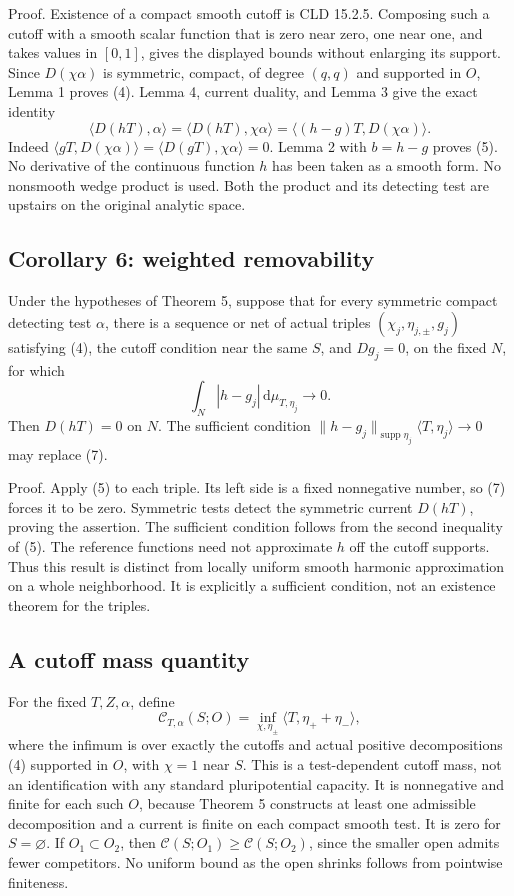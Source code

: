 \documentclass[11pt]{article}
\begin{document}
Proof. Existence of a compact smooth cutoff is CLD 15.2.5. Composing such a cutoff with a smooth scalar function that is zero near zero, one near one, and takes values in \([0,1]\), gives the displayed bounds without enlarging its support. Since \(D(\chi\alpha)\) is symmetric, compact, of degree \((q,q)\) and supported in \(O\), Lemma 1 proves (4). Lemma 4, current duality, and Lemma 3 give the exact identity
\[
 \langle D(hT),\alpha\rangle
 =\langle D(hT),\chi\alpha\rangle
 =\langle (h-g)T,D(\chi\alpha)\rangle.\tag{6}
\]
Indeed \(\langle gT,D(\chi\alpha)\rangle=\langle D(gT),\chi\alpha\rangle=0\). Lemma 2 with \(b=h-g\) proves (5). No derivative of the continuous function \(h\) has been taken as a smooth form. No nonsmooth wedge product is used. Both the product and its detecting test are upstairs on the original analytic space.

\subsection{Corollary 6: weighted removability}

Under the hypotheses of Theorem 5, suppose that for every symmetric compact detecting test \(\alpha\), there is a sequence or net of actual triples \((\chi_j,\eta_{j,\pm},g_j)\) satisfying (4), the cutoff condition near the same \(S\), and \(Dg_j=0\), on the fixed \(N\), for which
\[
 \int_N|h-g_j|\,\mathrm d\mu_{T,\eta_j}\longrightarrow0.\tag{7}
\]
Then \(D(hT)=0\) on \(N\). The sufficient condition \(\|h-g_j\|_{\operatorname{supp}\eta_j}\langle T,\eta_j\rangle\to0\) may replace (7).

Proof. Apply (5) to each triple. Its left side is a fixed nonnegative number, so (7) forces it to be zero. Symmetric tests detect the symmetric current \(D(hT)\), proving the assertion. The sufficient condition follows from the second inequality of (5). The reference functions need not approximate \(h\) off the cutoff supports. Thus this result is distinct from locally uniform smooth harmonic approximation on a whole neighborhood. It is explicitly a sufficient condition, not an existence theorem for the triples.

\subsection{A cutoff mass quantity}

For the fixed \(T,Z,\alpha\), define
\[
 \mathcal C_{T,\alpha}(S;O)
 =\inf_{\chi,\eta_\pm}\langle T,\eta_++\eta_-\rangle,\tag{8}
\]
where the infimum is over exactly the cutoffs and actual positive decompositions (4) supported in \(O\), with \(\chi=1\) near \(S\). This is a test-dependent cutoff mass, not an identification with any standard pluripotential capacity. It is nonnegative and finite for each such \(O\), because Theorem 5 constructs at least one admissible decomposition and a current is finite on each compact smooth test. It is zero for \(S=\varnothing\). If \(O_1\subset O_2\), then \(\mathcal C(S;O_1)\geq\mathcal C(S;O_2)\), since the smaller open admits fewer competitors. No uniform bound as the open shrinks follows from pointwise finiteness.
\end{document}
